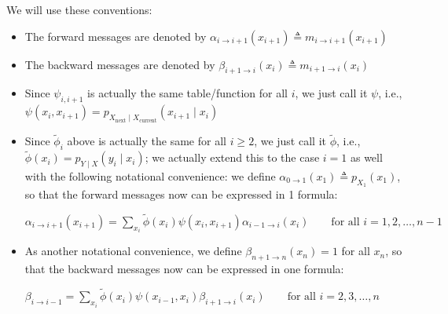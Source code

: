 \documentclass[6008notes.tex]{subfiles}
\begin{document}
{ \par}

We will use these conventions:

\begin{itemize}
\item The forward messages are denoted by $\alpha _{i\rightarrow i+1}(x_{i+1})\triangleq m_{i\rightarrow i+1}(x_{i+1})$

\item The backward messages are denoted by $\beta _{i+1\rightarrow i}(x_{i})\triangleq m_{i+1\rightarrow i}(x_{i})$

\item Since $\psi _{i,i+1}$ is actually the same table/function for all $i$, we just call it $\psi$, i.e., $\psi (x_{i},x_{i+1})=p_{X_{\text {next}}\mid X_{\text {current}}}(x_{i+1}\mid x_{i})$

\item Since $\widetilde{\phi}_{i}$ above is actually the same for all $i \ge 2$, we just call it $\widetilde{\phi}$, i.e., $\widetilde{\phi }(x_{i})=p_{Y\mid X}(y_{i}\mid x_{i})$; we actually extend this to the case $i=1$ as well with the following notational convenience: we define $\alpha _{0\rightarrow 1}(x_{1})\triangleq p_{X_{1}}(x_{1})$, so that the forward messages now can be expressed in 1 formula:

{\centering$\alpha _{i\rightarrow i+1}(x_{i+1})=\sum _{x_{i}}\widetilde{\phi }(x_{i})\psi (x_{i},x_{i+1})\alpha _{i-1\rightarrow i}(x_{i})\qquad \text {for all }i=1,2,\dots ,n-1$ \par}
 
\item As another notational convenience, we define $\beta _{n+1\rightarrow n}(x_{n})=1$ for all $x_n$, so that the backward messages now can be expressed in one formula:

{\centering$\beta _{i\rightarrow i-1}=\sum _{x_{i}}\widetilde{\phi }(x_{i})\psi (x_{i-1},x_{i})\beta _{i+1\rightarrow i}(x_{i})\qquad \text {for all }i=2,3,\dots ,n$ \par}

\end{itemize}
 
\end{document}
